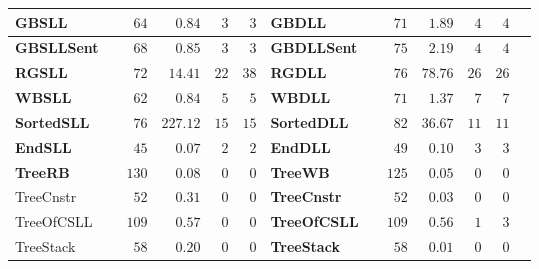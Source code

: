 \documentclass{beamer}
\newcommand{\hcol}[1]{yellow!20!orange!20}
\newcommand{\ucol}[1]{red!50}
\newcommand{\scol}[1]{blue!40}
\begin{document}
\begin{frame}
\begin{center}
\begin{adjustbox}{max height=\textheight, max width=\textwidth}
\begin{tabular}{| l | l | r | r | r | r || l | l | r | r | r | r | r |}
		\rowcolor{\hcol{}}
        \hline
		\textbf{GBSLL}       & \cellcolor{\scol{}} \safe & $64$ & $0.84$   &  $3$ & $3$ & \textbf{GBDLL} &  \cellcolor{\scol{}}  \safe & $71$ &  $1.89$  & $4$ & $4$ \\
        \hline
		\rowcolor{\hcol{}}
		\textbf{GBSLLSent}   & \cellcolor{\scol{}} \safe  & $68$ & $0.85$   &  $3$ & $3$ & \textbf{GBDLLSent} & \cellcolor{\scol{}} \safe & $75$ &  $2.19$  & $4$ & $4$ \\
        \hline
		\rowcolor{\hcol{}}
		\textbf{RGSLL}       & \cellcolor{\scol{}} \safe & $72$ & $14.41$  &  $22$  & $38$ & \textbf{RGDLL} & \cellcolor{\scol{}} \safe & $76$ &  $78.76$ & $26$ & $26$ \\
        \hline
		\rowcolor{\hcol{}}
		\textbf{WBSLL}       & \cellcolor{\scol{}} \safe & $62$ & $0.84$   &  $5$  & $5$ & \textbf{WBDLL} & \cellcolor{\scol{}} \safe & $71$ &  $1.37$  & $7$ & $7$ \\
        \hline
		\rowcolor{\hcol{}}
		\textbf{SortedSLL}   & \cellcolor{\scol{}} \safe & $76$ & $227.12$ &  $15$ & $15$ & \textbf{SortedDLL} & \cellcolor{\scol{}} \safe & $82$ &  $36.67$ & $11$ & $11$ \\
        \hline
		\rowcolor{\hcol{}}
		\textbf{EndSLL}      & \cellcolor{\scol{}} \safe  & $45$ & $0.07$   &  $2$  & $2$ & \textbf{EndDLL} & \cellcolor{\scol{}} \safe & $49$ &  $0.10$  & $3$ & $3$ \\
        \hline
		\rowcolor{\hcol{}}
		\textbf{TreeRB} & \cellcolor{\ucol{}}\unsafe & $130$ &  $0.08$  & $0$  & $0$ & \textbf{TreeWB} & \cellcolor{\ucol{}}\unsafe & $125$ &  $0.05$  & $0$ & $0$ \\
        \hline
		TreeCnstr & \cellcolor{\scol{}} \safe & $52$ & $0.31$  & $0$  & $0$ & \cellcolor{\hcol{}}\textbf{TreeCnstr} & \cellcolor{\ucol{}}\unsafe & \cellcolor{\hcol{}} $52$ & \cellcolor{\hcol{}} $0.03$  & \cellcolor{\hcol{}} $0$ & \cellcolor{\hcol{}} $0$ \\
        \hline
		TreeOfCSLL & \cellcolor{\scol{}} \safe & $109$ &  $0.57$  & $0$  & $0$ & \cellcolor{\hcol{}}\textbf{TreeOfCSLL}  & \cellcolor{\ucol{}}\unsafe & \cellcolor{\hcol{}} $109$ & \cellcolor{\hcol{}} $0.56$  & \cellcolor{\hcol{}} $1$ & \cellcolor{\hcol{}} $3$ \\
        \hline
		TreeStack & \cellcolor{\scol{}} \safe & $58$ &  $0.20$  & $0$  & $0$ & \cellcolor{\hcol{}}\textbf{TreeStack} & \cellcolor{\ucol{}}\unsafe & \cellcolor{\hcol{}} $58$ & \cellcolor{\hcol{}} $0.01$  & \cellcolor{\hcol{}} $0$ & \cellcolor{\hcol{}} $0$ \\

\end{tabular}
\end{adjustbox}
\end{center}
\end{frame}
\end{document}
